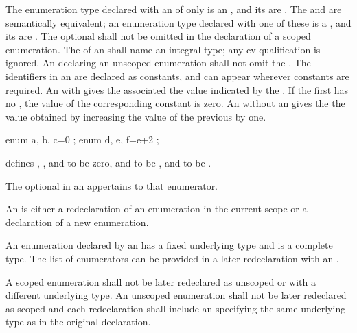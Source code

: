 \pnum
{}%
The enumeration type declared with an 
of only  is an ,
and its  are .
The   and
 are semantically equivalent; an enumeration
type declared with one of these is a ,
and its  are .
The optional  shall not be omitted in the declaration of a scoped enumeration.
The  of an 
shall name an integral type; any cv-qualification is ignored.
An  declaring an unscoped enumeration shall
not omit the .
The identifiers in an  are declared as
constants, and can appear wherever constants are required.
%
An  with \tcode{=} gives the associated
 the value indicated by the
.
If the first 
has no , the value of the corresponding constant
is zero. An  without an
 gives the  the value
obtained by increasing the value of the previous 
by one.
\begin{example}
\begin{codeblock}
enum { a, b, c=0 };
enum { d, e, f=e+2 };
\end{codeblock}
defines , , and  to be zero,  and
 to be , and  to be .
\end{example}
The optional  in an
 appertains to that enumerator.

\pnum
An  is either a redeclaration
of an enumeration in the current scope or a declaration of a new enumeration.
\begin{note}
An enumeration declared by an
 has a fixed underlying type and is a
complete type. The list of enumerators can be provided in a later redeclaration
with an .
\end{note}
A scoped enumeration
shall not be later redeclared as unscoped or with a different underlying type.
An unscoped enumeration shall not be later redeclared as scoped and each
redeclaration shall include an  specifying the same
underlying type as in the original declaration.

